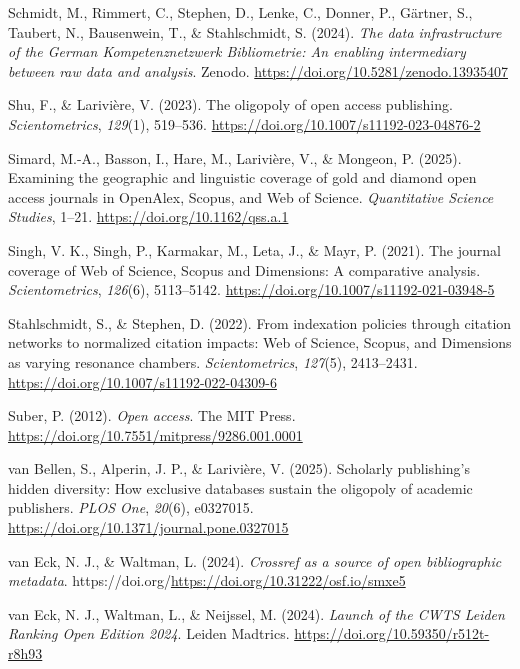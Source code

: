 \documentclass[a4paper,man,floatsintext,longtable,noextraspace,10pt]{apa6}
\newlength{\cslhangindent}
\newenvironment{CSLReferences}[2] %
{\begin{list}{}{%
  \setlength{\itemindent}{0pt}
  \setlength{\leftmargin}{0pt}
  \setlength{\parsep}{0pt}
  \ifodd #1
  \setlength{\leftmargin}{\cslhangindent}
  \setlength{\itemindent}{-1\cslhangindent}
  \fi
  \setlength{\itemsep}{#2\baselineskip}}}
{\end{list}}
\begin{document}
\begin{CSLReferences}{1}{0}
Schmidt, M., Rimmert, C., Stephen, D., Lenke, C., Donner, P., Gärtner,
S., Taubert, N., Bausenwein, T., \& Stahlschmidt, S. (2024). \emph{The
data infrastructure of the {German Kompetenznetzwerk Bibliometrie}: An
enabling intermediary between raw data and analysis}. Zenodo.
\url{https://doi.org/10.5281/zenodo.13935407}

Shu, F., \& Larivière, V. (2023). The oligopoly of open access
publishing. \emph{Scientometrics}, \emph{129}(1), 519--536.
\url{https://doi.org/10.1007/s11192-023-04876-2}

Simard, M.-A., Basson, I., Hare, M., Larivière, V., \& Mongeon, P.
(2025). Examining the geographic and linguistic coverage of gold and
diamond open access journals in {OpenAlex}, {Scopus}, and {Web of
Science}. \emph{Quantitative Science Studies}, 1--21.
\url{https://doi.org/10.1162/qss.a.1}

Singh, V. K., Singh, P., Karmakar, M., Leta, J., \& Mayr, P. (2021). The
journal coverage of {Web of Science}, {Scopus} and {Dimensions}: A
comparative analysis. \emph{Scientometrics}, \emph{126}(6), 5113--5142.
\url{https://doi.org/10.1007/s11192-021-03948-5}

Stahlschmidt, S., \& Stephen, D. (2022). From indexation policies
through citation networks to normalized citation impacts: {Web of
Science}, {Scopus}, and {Dimensions} as varying resonance chambers.
\emph{Scientometrics}, \emph{127}(5), 2413--2431.
\url{https://doi.org/10.1007/s11192-022-04309-6}

Suber, P. (2012). \emph{Open access}. The MIT Press.
\url{https://doi.org/10.7551/mitpress/9286.001.0001}

van Bellen, S., Alperin, J. P., \& Larivière, V. (2025). Scholarly
publishing's hidden diversity: How exclusive databases sustain the
oligopoly of academic publishers. \emph{PLOS One}, \emph{20}(6),
e0327015. \url{https://doi.org/10.1371/journal.pone.0327015}

van Eck, N. J., \& Waltman, L. (2024). \emph{Crossref as a source of
open bibliographic metadata}.
https://doi.org/\url{https://doi.org/10.31222/osf.io/smxe5}

van Eck, N. J., Waltman, L., \& Neijssel, M. (2024). \emph{{Launch of
the CWTS Leiden Ranking Open Edition 2024}}. Leiden Madtrics.
\url{https://doi.org/10.59350/r512t-r8h93}


\end{CSLReferences}
\end{document}
